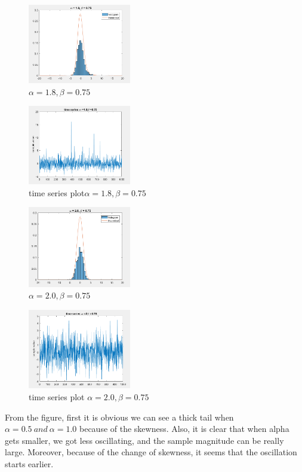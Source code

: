 \documentclass[twoside]{article}
\begin{document}
\begin{multicols*}{2}
\begin{figure}[H]
   \centering
   \includegraphics[width = 0.4\textwidth]{../data/a18b75.png}  
   \caption{$\alpha = 1.8, \beta = 0.75$}
\end{figure}
\begin{figure}[H]
   \centering
   \includegraphics[width = 0.4\textwidth]{../data/a18b75time.png}  
   \caption{time series plot$\alpha = 1.8, \beta = 0.75$}
\end{figure}

\begin{figure}[H]
   \centering
   \includegraphics[width = 0.4\textwidth]{../data/a2b75.png}  
   \caption{$\alpha = 2.0, \beta = 0.75$}
\end{figure}
\begin{figure}[H]
   \centering
   \includegraphics[width = 0.4\textwidth]{../data/a2b75time.png}  
   \caption{time series plot $\alpha = 2.0, \beta = 0.75$}
\end{figure}
From the figure, first it is obvious we can see a thick tail when $\alpha=0.5 ~and ~\alpha = 1.0$ because of the skewness. Also, it is clear that when alpha gets smaller, we got less oscillating, and the sample magnitude can be really large. Moreover, because of the change of skewness, it seems that the oscillation starts earlier.\\
\end{multicols*}
\end{document}
